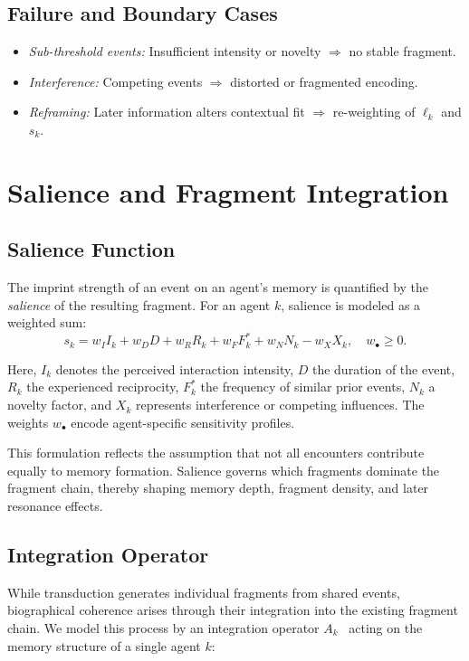 \documentclass[12pt,a4paper]{article}
\begin{document}
\subsection{Failure and Boundary Cases}
\begin{itemize}
    \item \emph{Sub-threshold events:}
    Insufficient intensity or novelty $\Rightarrow$ no stable fragment.
    \item \emph{Interference:}
    Competing events $\Rightarrow$ distorted or fragmented encoding.
    \item \emph{Reframing:}
    Later information alters contextual fit $\Rightarrow$
    re-weighting of $\ell_k$ and $s_k$.
\end{itemize}


\section{Salience and Fragment Integration}

\subsection{Salience Function}

The imprint strength of an event on an agent’s memory is quantified
by the \emph{salience} of the resulting fragment.
For an agent $k$, salience is modeled as a weighted sum:
\begin{equation}
s_k
= w_I I_k
+ w_D D
+ w_R R_k
+ w_F F_k^*
+ w_N N_k
- w_X X_k,
\quad w_\bullet \ge 0.
\end{equation}

Here, $I_k$ denotes the perceived interaction intensity,
$D$ the duration of the event,
$R_k$ the experienced reciprocity,
$F_k^*$ the frequency of similar prior events,
$N_k$ a novelty factor,
and $X_k$ represents interference or competing influences.
The weights $w_\bullet$ encode agent-specific sensitivity profiles.

This formulation reflects the assumption that not all encounters
contribute equally to memory formation.
Salience governs which fragments dominate the fragment chain,
thereby shaping memory depth, fragment density, and later resonance effects.

\subsection{Integration Operator}

While transduction generates individual fragments from shared events, biographical
coherence arises through their integration into the existing fragment chain.
We model this process by an integration operator $A_k$~ acting on the memory structure of a
single agent $k$:
\end{document}
